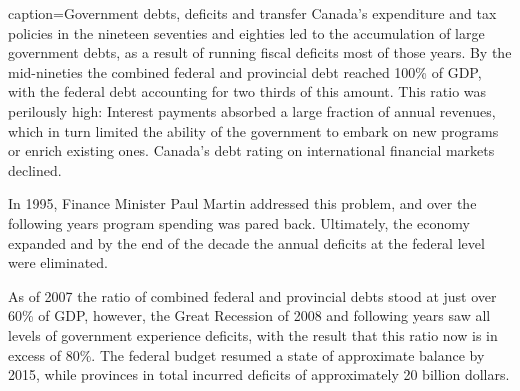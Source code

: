 \begin{ApplicationBox}{caption={Government debts, deficits and transfer \label{app:govdebtdeftran}}}
	Canada's expenditure and tax policies in the nineteen seventies and eighties led to the accumulation of large government debts, as a result of running fiscal deficits most of those years. By the mid-nineties the combined federal and provincial debt reached 100\% of GDP, with the federal debt accounting for two thirds of this amount. This ratio was perilously high: Interest payments absorbed a large fraction of annual revenues, which in turn limited the ability of the government to embark on new programs or enrich existing ones. Canada's debt rating on international financial markets declined.

	In 1995, Finance Minister Paul Martin addressed this problem, and over the following years program spending was pared back. Ultimately, the economy expanded and by the end of the decade the annual deficits at the federal level were eliminated.

	As of 2007 the ratio of combined federal and provincial debts stood at just over 60\% of GDP, however, the Great Recession of 2008 and following years saw all levels of government experience deficits, with the result that this ratio now is in excess of 80\%. The federal budget resumed a state of approximate balance by 2015, while provinces in total incurred deficits of approximately 20 billion dollars. 
\end{ApplicationBox}